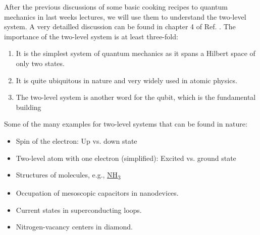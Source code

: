 After the previous discussions of some basic cooking recipes to quantum mechanics in last weeks lectures, we will use them to understand the two-level system. A very detailled discussion can be found in chapter 4 of Ref. \cite{1}. The importance of the two-level system is at least three-fold:
\begin{enumerate}
\item It is the simplest system of quantum mechanics as it spans a Hilbert space of only two states.
\item It is quite ubiquitous in nature and very widely used in atomic physics.
\item The two-level system is another word for the qubit, which is the fundamental building 
\end{enumerate}
Some of the many examples for two-level systems that can be found in nature:
\begin{itemize}
	\item Spin of the electron: Up vs. down state
	\item Two-level atom with one electron (simplified): Excited vs. ground state
	\item Structures of molecules, e.g., \hyperref[fig:twostate]{NH\textsubscript{3}}
	\item Occupation of mesoscopic capacitors in nanodevices.
	\item Current states in superconducting loops.
	\item Nitrogen-vacancy centers in diamond.
\end{itemize}